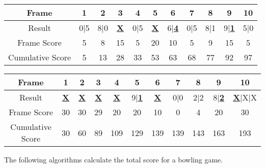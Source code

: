 \begin{tabular}{|c|c|c|c|c|c|c|c|c|c|c|}
\hline 
Frame & 1 & 2 & 3 & 4 & 5 & 6 & 7 & 8 & 9 & 10\tabularnewline
\hline 
Result & 0|5 & 8|0 & \textbf{\uline{X}} & 0|5 & \textbf{\uline{X}} & 6|\textbf{\uline{4}} & 0|5 & 8|1 & 9|\textbf{\uline{1}} & 5|0\tabularnewline
\hline 
Frame Score & 5 & 8 & 15 & 5 & 20 & 10 & 5 & 9 & 15 & 5\tabularnewline
\hline 
Cumulative Score & 5 & 13 & 28 & 33 & 53 & 63 & 68 & 77 & 92 & 97\tabularnewline
\hline 
\end{tabular}

\begin{tabular}{|c|c|c|c|c|c|c|c|c|c|c|}
\hline 
Frame & 1 & 2 & 3 & 4 & 5 & 6 & 7 & 8 & 9 & 10\tabularnewline
\hline 
Result & \textbf{\uline{X}} & \textbf{\uline{X}} & \textbf{\uline{X}} & \textbf{\uline{X}} & 9|\textbf{\uline{1}} & \textbf{\uline{X}} & 0|0 & 2|2 & 8|\textbf{\uline{2}} & \textbf{\uline{X}}|X|X\tabularnewline
\hline 
Frame Score & 30 & 30 & 29 & 20 & 20 & 10 & 0 & 4 & 20 & 30\tabularnewline
\hline 
Cumulative Score & 30 & 60 & 89 & 109 & 129 & 139 & 139 & 143 & 163 & 193\tabularnewline
\hline 
\end{tabular}

The following algorithms calculate the total score for a bowling game.

